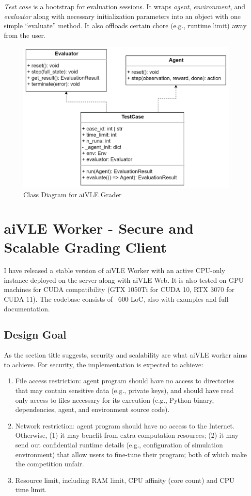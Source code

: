 \textit{Test case} is a bootstrap for evaluation sessions. It wraps \textit{agent}, \textit{environment}, and \textit{evaluator} along with necessary initialization parameters into an object with one simple “evaluate” method. It also offloads certain chore (e.g., runtime limit) away from the user.
\begin{figure}[H]
    \centering
    \includegraphics{images/aivle-grader-class.png}
    \caption{Class Diagram for aiVLE Grader}
    \label{fig:aivle-grader-class}
\end{figure}

\section{aiVLE Worker - Secure and Scalable Grading Client}
\label{ch:aivle-worker}
I have released a stable version of aiVLE Worker with an active CPU-only instance deployed on the server along with aiVLE Web. It is also tested on GPU machines for CUDA compatibility (GTX 1050Ti for CUDA 10, RTX 3070 for CUDA 11). The codebase consists of ~600 LoC, also with examples and full documentation.

\subsection{Design Goal}
As the section title suggests, security and scalability are what aiVLE worker aims to achieve. For security, the implementation is expected to achieve:
\begin{enumerate}
    \item File access restriction: agent program should have no access to directories that may contain sensitive data (e.g., private keys), and should have read only access to files necessary for its execution (e.g., Python binary, dependencies, agent, and environment source code).
    \item Network restriction: agent program should have no access to the Internet. Otherwise, (1) it may benefit from extra computation resources; (2) it may send out confidential runtime details (e.g., configuration of simulation environment) that allow users to fine-tune their program; both of which make the competition unfair.
    \item Resource limit, including RAM limit, CPU affinity (core count) and CPU time limit.
\end{enumerate}

